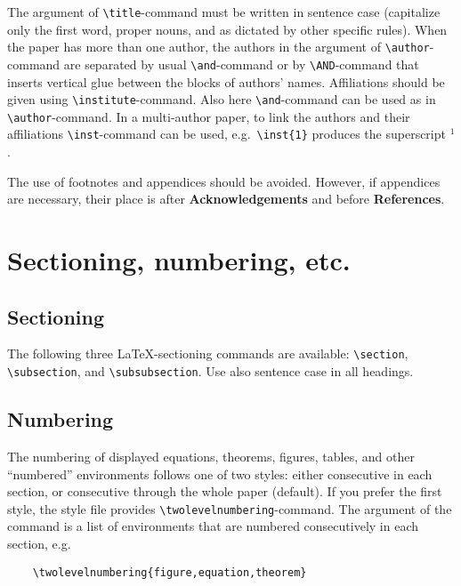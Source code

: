 \documentclass{DIKU-report}[2006/05/09]
\begin{document}
The argument of \verb|\title|-command must be written in sentence case
(capitalize only the first word, proper nouns, and as dictated by
other specific rules).  When the paper has more than one author, the
authors in the argument of \verb|\author|-command are separated by
usual \verb|\and|-command or by \verb|\AND|-command that inserts
vertical glue between the blocks of authors' names. Affiliations
should be given using \verb|\institute|-command. Also here
\verb|\and|-command can be used as in \verb|\author|-command. In a
multi-author paper, to link the authors and their affiliations
\verb|\inst|-command can be used, e.g.~\verb|\inst{1}| produces the
superscript $^1$.

The use of footnotes and appendices should be avoided.  However, if
appendices are necessary, their place is after
\textbf{Acknowledgements} and before \textbf{References}.

\section{Sectioning, numbering, etc.}

\subsection{Sectioning}

The following three \LaTeX-sectioning commands are available:
\verb|\section|, \verb|\subsection|, and \verb|\subsubsection|.
Use also sentence case in all headings.

\subsection{Numbering}
\label{numbering}

The numbering of displayed equations, theorems, figures, tables, and
other ``numbered'' environments follows one of two styles: either
consecutive in each section, or consecutive through the whole paper
(default).  If you prefer the first style, the style file provides
\verb|\twolevelnumbering|-command.  The argument of the command is a
list of environments that are numbered consecutively in each section,
e.g.
\begin{verbatim}
    \twolevelnumbering{figure,equation,theorem}
\end{verbatim}
\end{document}
